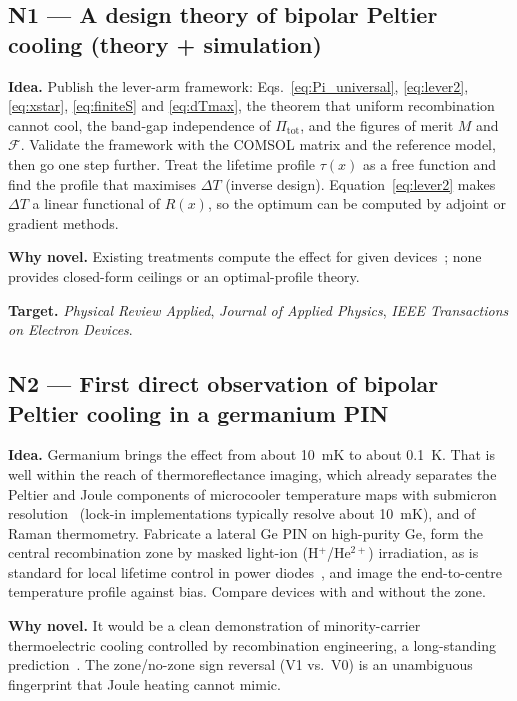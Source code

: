 \documentclass[11pt,a4paper]{article}
\newcommand{\Pit}{\Pi_{\mathrm{tot}}}
\begin{document}
\subsection{N1 --- A design theory of bipolar Peltier cooling (theory + simulation)}
\textbf{Idea.} Publish the lever-arm framework: Eqs.~\eqref{eq:Pi_universal}, \eqref{eq:lever2}, \eqref{eq:xstar}, \eqref{eq:finiteS} and \eqref{eq:dTmax}, the theorem that uniform recombination cannot cool, the band-gap independence of $\Pit$, and the figures of merit $M$ and $\mathcal F$. Validate the framework with the COMSOL matrix and the reference model, then go one step further. Treat the lifetime profile $\tau(x)$ as a free function and find the profile that maximises $\Delta T$ (inverse design). Equation~\eqref{eq:lever2} makes $\Delta T$ a linear functional of $R(x)$, so the optimum can be computed by adjoint or gradient methods.

\textbf{Why novel.} Existing treatments compute the effect for given devices~\cite{pipe2002}; none provides closed-form ceilings or an optimal-profile theory.

\textbf{Target.} \emph{Physical Review Applied}, \emph{Journal of Applied Physics}, \emph{IEEE Transactions on Electron Devices}.

\subsection{N2 --- First direct observation of bipolar Peltier cooling in a germanium PIN}
\textbf{Idea.} Germanium brings the effect from about \SI{10}{\milli\kelvin} to about \SI{0.1}{\kelvin}. That is well within the reach of thermoreflectance imaging, which already separates the Peltier and Joule components of microcooler temperature maps with submicron resolution~\cite{vermeersch2013} (lock-in implementations typically resolve about \SI{10}{\milli\kelvin}), and of Raman thermometry. Fabricate a lateral Ge PIN on high-purity Ge, form the central recombination zone by masked light-ion (H$^+$/He$^{2+}$) irradiation, as is standard for local lifetime control in power diodes~\cite{baliga}, and image the end-to-centre temperature profile against bias. Compare devices with and without the zone.

\textbf{Why novel.} It would be a clean demonstration of minority-carrier thermoelectric cooling controlled by recombination engineering, a long-standing prediction~\cite{pipe2002}. The zone/no-zone sign reversal (V1 vs.\ V0) is an unambiguous fingerprint that Joule heating cannot mimic.
\end{document}
